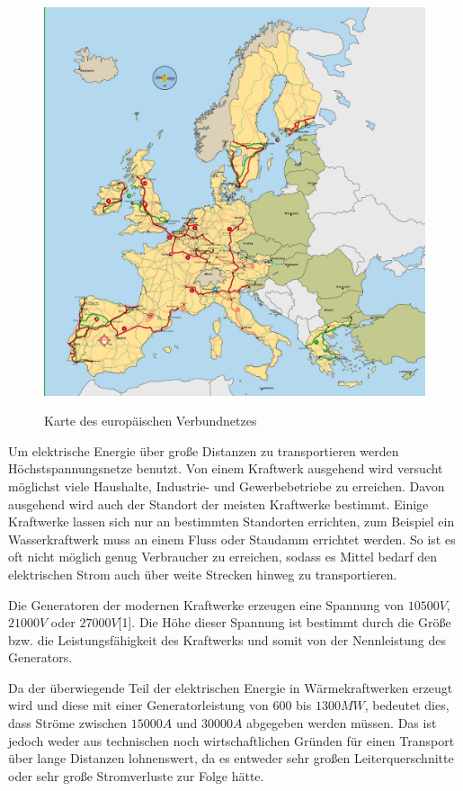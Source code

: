 \begin{figure}[t]
	\centering
	{\includegraphics[scale=0.9]{bilder/europastromnetz}\label{fig_europastromnetz}
	}\\
	\caption[Karte des europäischen Verbundnetzes]{Karte des europäischen Verbundnetzes}
	\label{fig_europastromnetz}
\end{figure}
Um elektrische Energie über große Distanzen zu transportieren werden Höchstspannungsnetze benutzt. Von einem Kraftwerk ausgehend wird versucht möglichst viele Haushalte, Industrie- und Gewerbebetriebe zu erreichen. Davon ausgehend wird auch der Standort der meisten Kraftwerke bestimmt. Einige Kraftwerke lassen sich nur an bestimmten Standorten errichten, zum Beispiel ein Wasserkraftwerk muss an einem Fluss oder Staudamm errichtet werden. So ist es oft nicht möglich genug Verbraucher zu erreichen, sodass es Mittel bedarf den elektrischen Strom auch über weite Strecken hinweg zu transportieren.

Die Generatoren der modernen Kraftwerke erzeugen eine Spannung von $10500 V$, $21000V$ oder $27000V$[1]. Die Höhe dieser Spannung ist bestimmt durch die Größe bzw. die Leistungsfähigkeit des Kraftwerks und somit von der Nennleistung des Generators.

Da der überwiegende Teil der elektrischen Energie in Wärmekraftwerken erzeugt wird und diese mit einer Generatorleistung von $600$ bis $1300MW$, bedeutet dies, dass Ströme zwischen $15000A$ und $30000A$ abgegeben werden müssen. Das ist jedoch weder aus technischen noch wirtschaftlichen Gründen für einen Transport über lange Distanzen lohnenswert, da es entweder sehr großen Leiterquerschnitte oder sehr große Stromverluste zur Folge hätte.

